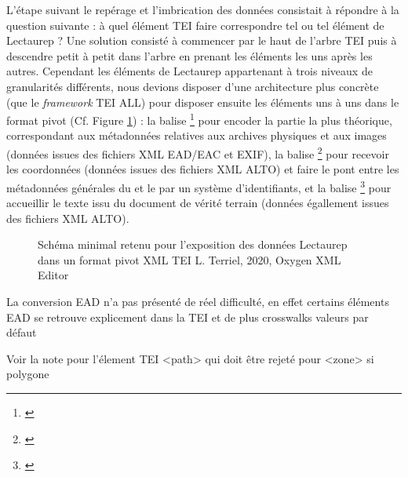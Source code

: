
L'étape suivant le repérage et l'imbrication des données consistait à répondre à la question suivante : à quel élément TEI faire correspondre tel ou tel élément de Lectaurep ? Une solution consisté à commencer par le haut de l'arbre TEI puis à descendre petit à petit dans l'arbre en prenant les éléments les uns après les autres. Cependant les éléments de Lectaurep appartenant à trois niveaux de granularités différents, nous devions disposer d'une architecture plus concrète (que le \textit{framework} TEI ALL) pour disposer ensuite les éléments uns à uns dans le format pivot (Cf. Figure \ref{fig:structure_general_template_tei_lectaurep}) : la balise \footnote{\cite{tei_tei_nodate}} pour encoder la partie la plus théorique, correspondant aux métadonnées relatives aux archives physiques et aux images (données issues des fichiers XML EAD/EAC et EXIF), la balise \footnote{\cite{tei_tei_nodate-2}} pour recevoir les coordonnées (données issues des fichiers XML ALTO) et faire le pont entre les métadonnées générales du  et le  par un système d'identifiants, et la balise \footnote{\cite{tei_tei_nodate-1}} pour accueillir le texte issu du document de vérité terrain (données égallement issues des fichiers XML ALTO). 

\begin{figure}[h]
    \centering
    \centerline{}
    \caption{Schéma minimal retenu pour l'exposition des données Lectaurep dans un format pivot XML TEI \textcopyright L. Terriel, 2020, Oxygen XML Editor}
    \label{fig:structure_general_template_tei_lectaurep}
\end{figure}


La conversion EAD n'a pas présenté de réel difficulté, en effet certains éléments EAD se retrouve explicement dans la TEI et de plus crosswalks 
valeurs par défaut 




Voir la note pour l'élement TEI <path> qui doit être rejeté pour <zone> si polygone


